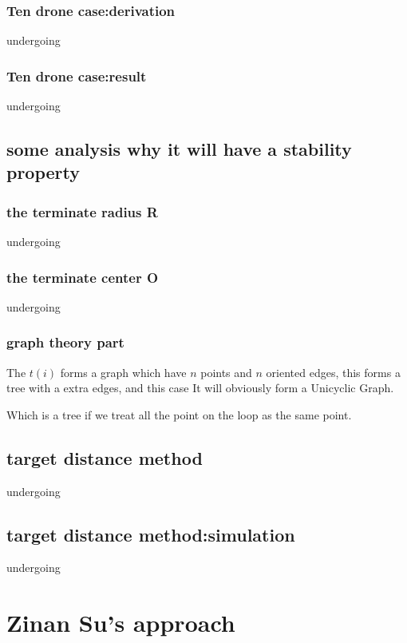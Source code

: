 \documentclass{article}
\theoremstyle{definition} %
\begin{document}
\subsubsection{Ten drone case:derivation}
undergoing

\subsubsection{Ten drone case:result}
undergoing

\subsection{some analysis why it will have a stability property}
\subsubsection{the terminate radius R}
undergoing

\subsubsection{the terminate center O}
undergoing

\subsubsection{graph theory part}
The \(t(i)\) forms a graph which have \(n\) points
and \(n\) oriented edges, this forms a tree with a extra
edges, and this case It will obviously form a Unicyclic Graph.

Which is a tree if we treat all the point on the
loop as the same point.

\subsection{target distance method}
undergoing

\subsection{target distance method:simulation}
undergoing


\section{Zinan Su's approach}
\end{document}
